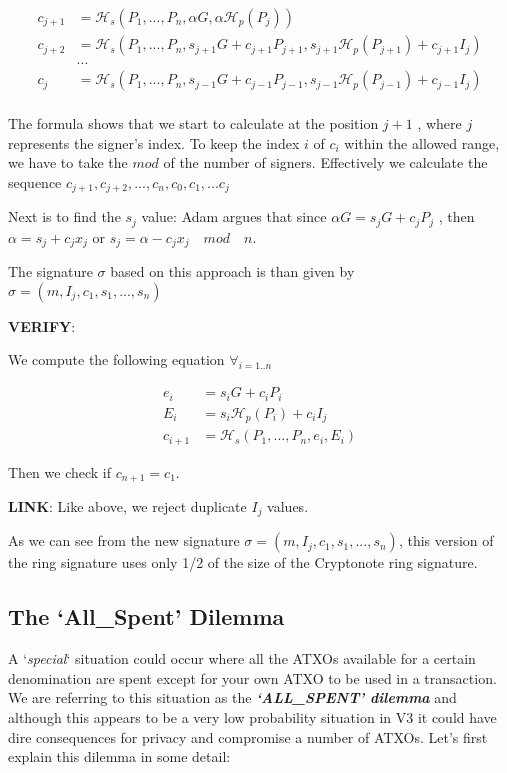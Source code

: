 \begin{equation}
\begin{split}
  c_{j+1} & = \mathcal{H}_s(P_1, ..., P_n, \alpha G, \alpha \mathcal{H}_p(P_j))\\
  c_{j+2} & = \mathcal{H}_s(P_1,...,P_n,s_{j+1}G+c_{j+1}P_{j+1},s_{j+1}\mathcal{H}_p(P_{j+1})+c_{j+1}I_j)\\
	      & ... \\
  c_{j} & = \mathcal{H}_s(P_1,...,P_n,s_{j-1}G+c_{j-1}P_{j-1},s_{j-1}\mathcal{H}_p(P_{j-1})+c_{j-1}I_j) \\
\end{split}
\end{equation}

\hfill \break The formula shows that we start to calculate at the position 
$j+1$ , where $j$ represents the signer's index. To keep the index $i$ of 
$c_i$ within the allowed range, we have to take the $mod$ of the number of 
signers. Effectively we calculate the sequence 
$c_{j+1}, c_{j+2}, ..., c_n, c_0, c_1, ... c_j$
 
\hfill \break Next is to find the $s_j$ value: Adam argues that since 
$\alpha G = s_jG+c_jP_j$ , then $\alpha = s_j+c_jx_j$ or 
$s_j = \alpha - c_jx_j\quad mod\quad n.$

\hfill \break The signature $\sigma$ based on this approach is than given 
by $\sigma = (m,I_j,c_1,s_1,...,s_n)$

\hfill \break\textbf{VERIFY}: 

We compute the following equation $\forall_{i=1..n}$

\begin{equation}
\begin{split}
 e_i &= s_iG+c_iP_i \\
 E_i &= s_i\mathcal{H}_p(P_i)+c_iI_j \\
 c_{i+1} &=\mathcal{H}_s(P_1,...,P_n,e_i,E_i)
\end{split}
\end{equation}

Then we check if $c_{n+1}=c_1$.

\hfill \break\textbf{LINK}: 
Like above, we reject duplicate $I_j$ values.


\hfill \break As we can see from the new signature $\sigma = 
(m,I_j,c_1,s_1,...,s_n)$, this version of the ring signature 
uses only 1/2 of the size of the Cryptonote ring signature.

\subsection{The ‘All\_Spent’ Dilemma}
A ‘\textit{special}‘ situation could occur where all the ATXOs available for a
certain denomination are spent except for your own ATXO to be used in a transaction.
We are referring to this situation as the \textbf{\textit{‘ALL\_SPENT’ dilemma}}
and although this appears to be a very low probability situation in V3 it could
have dire consequences for privacy and compromise a number of ATXOs. Let’s first
explain this dilemma in some detail:



